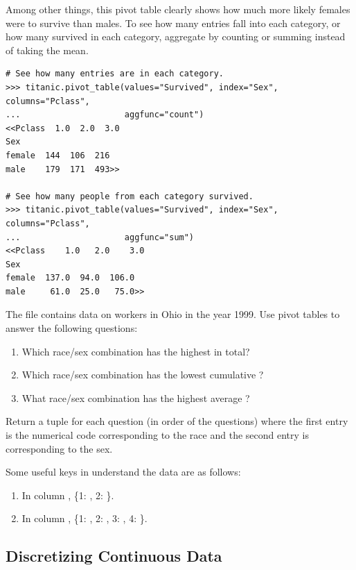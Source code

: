 Among other things, this pivot table clearly shows how much more likely females were to survive than males.
To see how many entries fall into each category, or how many survived in each category, aggregate by counting or summing instead of taking the mean.

\begin{lstlisting}
# See how many entries are in each category.
>>> titanic.pivot_table(values="Survived", index="Sex", columns="Pclass",
...                     aggfunc="count")
<<Pclass  1.0  2.0  3.0
Sex
female  144  106  216
male    179  171  493>>

# See how many people from each category survived.
>>> titanic.pivot_table(values="Survived", index="Sex", columns="Pclass",
...                     aggfunc="sum")
<<Pclass    1.0   2.0    3.0
Sex
female  137.0  94.0  106.0
male     61.0  25.0   75.0>>
\end{lstlisting}

\begin{problem}
The file  contains data on workers in Ohio in the year 1999.
Use pivot tables to answer the following questions:

\begin{enumerate}
\item Which race/sex combination has the highest  in total?
\item Which race/sex combination has the lowest cumulative ?
\item What race/sex combination has the highest average ?
\end{enumerate}

Return a tuple for each question (in order of the questions) where the first entry is the numerical code corresponding to the race and the second entry is corresponding to the sex.

Some useful keys in understand the data are as follows:
\begin{enumerate}
\item In column , \{1: , 2: \}.
\item In column , \{1: , 2: , 3: , 4: \}.
\end{enumerate}
\end{problem}

\subsection*{Discretizing Continuous Data} %

